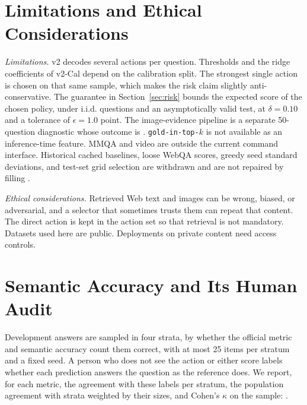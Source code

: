 \section{Limitations and Ethical Considerations}
\label{app:limitations}
\textit{Limitations.}
v2 decodes several actions per question.
Thresholds and the ridge coefficients of v2-Cal depend on the calibration split.
The strongest single action is chosen on that same sample, which makes the risk claim slightly anti-conservative.
The guarantee in Section~\ref{sec:risk} bounds the expected score of the chosen policy, under i.i.d. questions and an asymptotically valid test, at $\delta=0.10$ and a tolerance of $\epsilon=1.0$ point.
The image-evidence pipeline is a separate 50-question diagnostic whose outcome is \ph{}.
\texttt{gold-in-top-$k$} is not available as an inference-time feature.
MMQA and video are outside the current command interface.
Historical cached baselines, loose WebQA scores, greedy seed standard deviations, and test-set grid selection are withdrawn and are not repaired by filling \ph{}.

\label{app:ethics}
\textit{Ethical considerations.}
Retrieved Web text and images can be wrong, biased, or adversarial, and a selector that sometimes trusts them can repeat that content.
The direct action is kept in the action set so that retrieval is not mandatory.
Datasets used here are public.
Deployments on private content need access controls.

\section{Semantic Accuracy and Its Human Audit}
\label{app:semantic}
Development answers are sampled in four strata, by whether the official metric and semantic accuracy count them correct, with at most 25 items per stratum and a fixed seed. A person who does not see the action or either score labels whether each prediction answers the question as the reference does. We report, for each metric, the agreement with these labels per stratum, the population agreement with strata weighted by their sizes, and Cohen's $\kappa$ on the sample: \ph{}.
